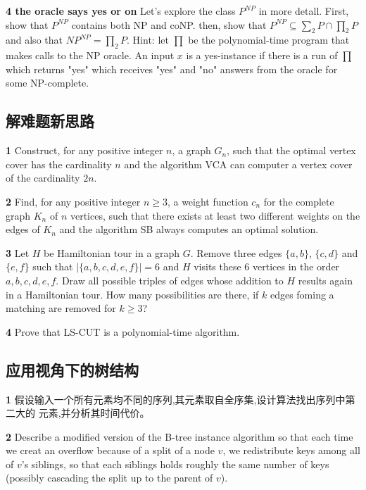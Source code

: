 \documentclass[a4paper,UTF8]{article}
\begin{document}
\vspace{6pt}

\textbf{4 the oracle says yes or on} Let's explore the class $P^{NP}$ in more detall.
First, show that $P^{NP}$ contains both NP and coNP. then, show that
$P^{NP} \subseteq \sum_{2} P \cap  \prod_{2} P$ and also that $NP^{NP}= \prod_{2}P$.
Hint: let $\prod$ be the polynomial-time program that makes calls to the NP oracle.
An input $x$ is a yes-instance if there is a run of $\prod$ which returns "yes"
which receives "yes" and "no" answers from the oracle for some NP-complete.

\subsection{解难题新思路}
\textbf{1} Construct, for any positive integer $n$, a graph $G_{n}$, such that the
optimal vertex cover has the cardinality $n$ and the algorithm VCA can computer a vertex
cover of the cardinality $2n$.

\vspace{6pt}

\textbf{2} Find, for any positive integer $n \geq 3$, a weight function $c_{n}$
for the complete graph $K_{n}$ of $n$ vertices, such that there exists at least two
different weights on the edges of $K_{n}$ and the algorithm SB always computes an
optimal solution.

\vspace{6pt}

\textbf{3} Let $H$ be Hamiltonian tour in a graph $G$. Remove three edges $\{ a, b \}$,
$\{c, d\}$ and $\{e, f\}$ such that $\left |  \{ a, b, c, d, e, f\}\right | = 6$ and
$H$ visits these 6 vertices in the order $a, b, c, d, e, f$. Draw all possible triples
of edges whose addition to $H$ results again in a Hamiltonian tour. How many possibilities
are there, if $k$ edges foming a matching are removed for $k \geq 3$?

\vspace{6pt}
\textbf{4} Prove that LS-CUT is a polynomial-time algorithm.

\subsection{应用视角下的树结构}
\textbf{1} 假设输入一个所有元素均不同的序列,其元素取自全序集,设计算法找出序列中第二大的
元素,并分析其时间代价。

\vspace{6pt}

\textbf{2} Describe a modified version of the B-tree instance algorithm so that
each time we creat an overflow because of a split of a node $v$, we redistribute
keys among all of $v$'s siblings, so that each siblings holds roughly the same number
of keys (possibly cascading the split up to the parent of $v$).
\end{document}

